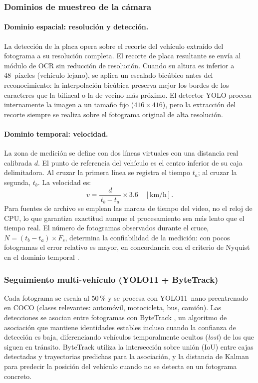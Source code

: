\documentclass[11pt]{article}
\begin{document}
\subsubsection{Dominios de muestreo de la cámara}

\paragraph{Dominio espacial: resolución y detección.}
La detección de la placa opera sobre el recorte del vehículo extraído del fotograma
a su resolución completa. El recorte de placa resultante se envía al módulo de OCR
sin reducción de resolución. Cuando su altura es inferior a 48~píxeles (vehículo
lejano), se aplica un escalado bicúbico antes del reconocimiento: la interpolación
bicúbica preserva mejor los bordes de los caracteres que la bilineal o la de vecino
más próximo. El detector YOLO procesa internamente la imagen a un tamaño fijo
($416\times416$), pero la extracción del recorte siempre se realiza sobre el
fotograma original de alta resolución.

\paragraph{Dominio temporal: velocidad.}
La zona de medición se define con dos líneas virtuales con una distancia real
calibrada $d$. El punto de referencia del vehículo es el centro inferior de su caja
delimitadora. Al cruzar la primera línea se registra el tiempo $t_a$; al cruzar la
segunda, $t_b$. La velocidad es:
\begin{equation}
    v = \frac{d}{\,t_b - t_a\,}\times 3.6 \quad [\text{km/h}].
    \label{eq:velocidad}
\end{equation}
Para fuentes de archivo se emplean las marcas de tiempo del video, no el reloj de
CPU, lo que garantiza exactitud aunque el procesamiento sea más lento que el tiempo
real. El número de fotogramas observados durante el cruce, $N = (t_b-t_a)\times F_s$,
determina la confiabilidad de la medición: con pocos fotogramas el error relativo
es mayor, en concordancia con el criterio de Nyquist en el dominio temporal
\cite{szeliski}.

\subsubsection{Seguimiento multi-vehículo (YOLO11 + ByteTrack)}

Cada fotograma se escala al 50\,\% y se procesa con YOLO11~nano preentrenado en
COCO \cite{yolo11} (clases relevantes: automóvil, motocicleta, bus, camión). Las
detecciones se asocian entre fotogramas con ByteTrack \cite{bytetrack}, un algoritmo
de asociación que mantiene identidades estables incluso cuando la confianza de
detección es baja, diferenciando vehículos temporalmente ocultos (\emph{lost}) de los
que siguen en tránsito. ByteTrack utiliza la intersección sobre unión (IoU) entre
cajas detectadas y trayectorias predichas para la asociación, y la distancia de
Kalman para predecir la posición del vehículo cuando no se detecta en un fotograma
concreto.
\end{document}
